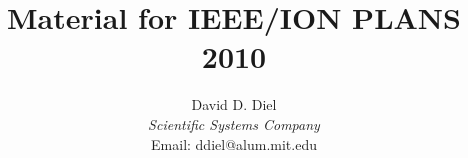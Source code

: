\documentclass[10pt,twocolumn]{article}
\begin{document}
\title{Material for IEEE/ION PLANS 2010}
\author{
  David D. Diel\\
  \textit{Scientific Systems Company}\\
  Email: ddiel@alum.mit.edu}
\date{}
\maketitle
\thispagestyle{empty}








\enlargethispage{-0cm} %
\end{document}
